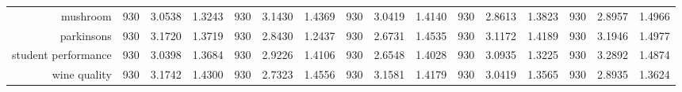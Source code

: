 \begin{table}[H]
{\begin{tabular}{rccccccccccccccc}
			mushroom                            & 930                                 & 3.0538                                                                    & 1.3243          & 930                            & 3.1430                                                                             & 1.4369          & 930                             & 3.0419                                                                    & 1.4140          & 930                             & \cellcolor[rgb]{ .776,  .937,  .808}\textcolor[rgb]{ 0,  .38,  0}{2.8613} & 1.3823          & 930                             & 2.8957          & 1.4966          \\
			parkinsons                          & 930                                 & 3.1720                                                                    & 1.3719          & 930                            & 2.8430                                                                             & 1.2437          & 930                             & \cellcolor[rgb]{ .776,  .937,  .808}\textcolor[rgb]{ 0,  .38,  0}{2.6731} & 1.4535          & 930                             & 3.1172                                                                    & 1.4189          & 930                             & 3.1946          & 1.4977          \\
			student performance                 & 930                                 & 3.0398                                                                    & 1.3684          & 930                            & 2.9226                                                                             & 1.4106          & 930                             & \cellcolor[rgb]{ .776,  .937,  .808}\textcolor[rgb]{ 0,  .38,  0}{2.6548} & 1.4028          & 930                             & 3.0935                                                                    & 1.3225          & 930                             & 3.2892          & 1.4874          \\
			wine quality                        & 930                                 & 3.1742                                                                    & 1.4300          & 930                            & \cellcolor[rgb]{ .776,  .937,  .808}\textcolor[rgb]{ 0,  .38,  0}{2.7323}          & 1.4556          & 930                             & 3.1581                                                                    & 1.4179          & 930                             & 3.0419                                                                    & 1.3565          & 930                             & 2.8935          & 1.3624          \\

\end{tabular}}
\end{table}

